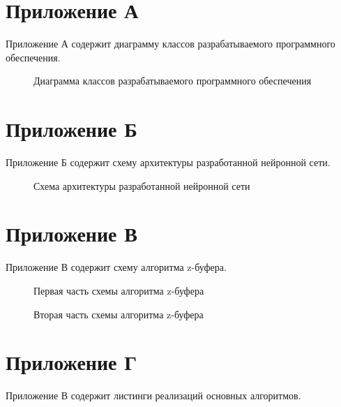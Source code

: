 \chapter*{Приложение А}
\renewcommand\thefigure{А.\arabic{figure}}  
\setcounter{figure}{0}
Приложение А содержит диаграмму классов разрабатываемого программного обеспечения.
\begin{figure}[H]
	\caption{Диаграмма классов разрабатываемого программного обеспечения}
	\label{fig:classes}
\end{figure}


\chapter*{Приложение Б}
\renewcommand\thefigure{Б.\arabic{figure}}  
\setcounter{figure}{0}
Приложение Б содержит схему архитектуры разработанной нейронной сети.
\begin{figure}[H]
	\caption{Схема архитектуры разработанной нейронной сети}
	\label{fig:cnn}
\end{figure}

\chapter*{Приложение В}
\renewcommand\thefigure{В.\arabic{figure}}  
\setcounter{figure}{0}
Приложение В содержит схему алгоритма z-буфера.
\begin{figure}[H]
	\caption{Первая часть схемы алгоритма z-буфера}
	\label{fig:z_buf_1}
\end{figure}

\begin{figure}[H]
	\caption{Вторая часть схемы алгоритма z-буфера}
	\label{fig:z_buf_2}
\end{figure}


\chapter*{Приложение Г}
\renewcommand\thelstlisting{Г.\arabic{lstlisting}}  
\setcounter{lstlisting}{0}
Приложение В содержит листинги реализаций основных алгоритмов.

